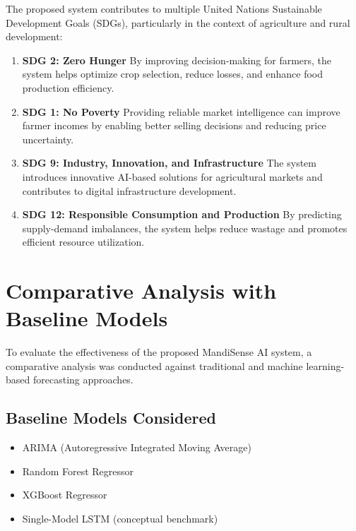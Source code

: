 \documentclass[12pt,a4paper]{report}
\begin{document}
The proposed system contributes to multiple United Nations Sustainable Development Goals (SDGs), particularly in the context of agriculture and rural development:

\begin{enumerate}
    \item \textbf{SDG 2: Zero Hunger}  
    By improving decision-making for farmers, the system helps optimize crop selection, reduce losses, and enhance food production efficiency.

    \item \textbf{SDG 1: No Poverty}  
    Providing reliable market intelligence can improve farmer incomes by enabling better selling decisions and reducing price uncertainty.

    \item \textbf{SDG 9: Industry, Innovation, and Infrastructure}  
    The system introduces innovative AI-based solutions for agricultural markets and contributes to digital infrastructure development.

    \item \textbf{SDG 12: Responsible Consumption and Production}  
    By predicting supply-demand imbalances, the system helps reduce wastage and promotes efficient resource utilization.

\end{enumerate}

\section{Comparative Analysis with Baseline Models}

To evaluate the effectiveness of the proposed MandiSense AI system, a comparative analysis was conducted against traditional and machine learning-based forecasting approaches.

\subsection{Baseline Models Considered}

\begin{itemize}
    \item ARIMA (Autoregressive Integrated Moving Average)
    \item Random Forest Regressor
    \item XGBoost Regressor
    \item Single-Model LSTM (conceptual benchmark)
\end{itemize}
\end{document}
